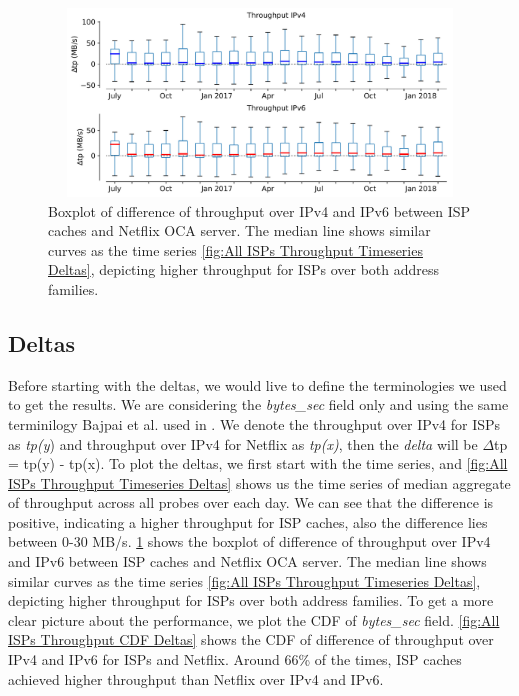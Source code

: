 \begin{figure}[!ht]
	\centering
	\includegraphics[keepaspectratio, height=5cm, width=15cm]{figures/cache/allisps/netflix-throughput-boxplot-all-isps.pdf}
	\caption[All ISPs Throughput Boxplot Deltas]{Boxplot of difference of throughput over IPv4 and IPv6 between ISP caches and Netflix OCA server. The median line shows similar curves as the time series \cref{fig:All ISPs Throughput Timeseries Deltas}, depicting higher throughput for ISPs over both address families.}
	\label{fig:All ISPs Throughput Boxplot Deltas}
\end{figure}

\subsection*{Deltas}

Before starting with the deltas, we would live to define the terminologies we used to get the results. We are considering the \textit{bytes\_sec} field only and using the same terminilogy Bajpai et al. used in \cite{bajpaimeasuring}. We denote the throughput 
over IPv4 for ISPs as \textit{tp(y}) and throughput over IPv4 for Netflix as \textit{tp(x)}, then the \textit{delta} will be $\Delta$tp = tp(y) - tp(x).
To plot the deltas, we first start with the time series, and \cref{fig:All ISPs Throughput Timeseries Deltas} shows us the time series of median aggregate of throughput across all probes over each day.
We can see that the difference is positive, indicating a higher throughput for ISP caches, also the difference lies between 0-30 MB/s.
\cref{fig:All ISPs Throughput Boxplot Deltas} shows the boxplot of difference of throughput over IPv4 and IPv6 between ISP caches and Netflix OCA server. The median line shows similar curves as the time series \cref{fig:All ISPs Throughput Timeseries Deltas}, depicting higher throughput for ISPs over both address families.
To get a more clear picture about the performance, we plot the CDF of \textit{bytes\_sec} field. 
\cref{fig:All ISPs Throughput CDF Deltas} shows the CDF of difference of throughput over IPv4 and IPv6 for ISPs and Netflix. 
Around 66\% of the times, ISP caches achieved higher throughput than Netflix over IPv4 and IPv6.

